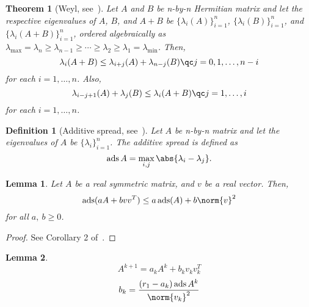 \documentclass[nobib]{my-handout}
\newtheorem{theorem}{Theorem}
\newtheorem{definition}{Definition}
\newtheorem{lemma}{Lemma}
\begin{document}
\maketitle


\begin{theorem}[Weyl, see~\cite{horn_matrix_2012}]
	Let $A$ and $B$ be n-by-n Hermitian matrix and let the respective eigenvalues
	of $A$, $B$, and $A+B$ be $\{\lambda_i(A)\}_{i=1}^n$,
	$\{\lambda_i(B)\}_{i=1}^n$, and $\{\lambda_i(A+B)\}_{i=1}^n$, ordered
	algebraically as $\lambda_{\max} = \lambda_n \ge \lambda_{n-1} \ge \cdots \ge
	\lambda_2 \ge \lambda_1 = \lambda_{\min}$. Then,
	\begin{equation*}
		\lambda_i(A+B) \le \lambda_{i+j}(A) + \lambda_{n-j}(B)\qc j=0,1,\dotsc,n-i
	\end{equation*}
	for each $i=1,\dotsc,n$. Also,
	\begin{equation*}
		\lambda_{i-j+1}(A) + \lambda_j(B) \le \lambda_i(A+B)\qc j=1,\dotsc,i
	\end{equation*}
	for each $i=1,\dotsc,n$.
\end{theorem}

\begin{definition}[Additive spread, see~\cite{merikoski_inequalities_2004}]
	Let $A$ be n-by-n matrix and let the eigenvalues of $A$ be
	$\{\lambda_i\}_{i=1}^n$. The \textit{additive spread} is defined as 
	\begin{equation*}
		\operatorname{ads} A = \operatorname*{max}_{i, j} \abs{\lambda_i -
		\lambda_j}.
	\end{equation*}
\end{definition}

\begin{lemma}
	Let $A$ be a real symmetric matrix, and $v$ be a real vector. Then,
	\begin{equation*}
		\operatorname{ads} (aA + bvv^T) \le a \operatorname{ads}(A) + b \norm{v}^2
	\end{equation*}
	for all $a,\ b \ge 0$.
\end{lemma}

\begin{proof}
	See Corollary 2 of~\cite{merikoski_inequalities_2004}.
\end{proof}

\begin{lemma}
	\begin{equation*}
		A^{k+1} = a_k A^k + b_k v_k v_k^T
	\end{equation*}
	\begin{equation*}
		b_k = \frac{(r_1- a_k) \operatorname{ads} A^k}{\norm{v_k}^2}
	\end{equation*}
\end{lemma}
\end{document}
